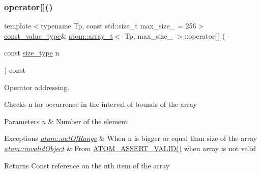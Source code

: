 \subsubsection{\texorpdfstring{operator[]()}{operator[]()}\hspace{0.1cm}{\footnotesize\ttfamily [1/2]}}
{\footnotesize\ttfamily template$<$typename Tp, const std\+::size\+\_\+t max\+\_\+size\+\_\+ = 256$>$ \\
\hyperlink{classatom_1_1array__t_a9c33ee3fb4e5b4d57c7801a8f69ada14}{const\+\_\+value\+\_\+type}\& \hyperlink{classatom_1_1array__t}{atom\+::array\+\_\+t}$<$ Tp, max\+\_\+size\+\_\+ $>$\+::operator\mbox{[}$\,$\mbox{]} (\begin{DoxyParamCaption}\item[{const \hyperlink{classatom_1_1array__t_a8534f23c7f0082698cbd708e1f2e26ff}{size\+\_\+type}}]{n }\end{DoxyParamCaption}) const\hspace{0.3cm}{\ttfamily [inline]}}



Operator addressing. 

Checks n for occurrence in the interval of bounds of the array 
\begin{DoxyParams}{Parameters}
{\em n} & Number of the element \\
\hline
\end{DoxyParams}

\begin{DoxyExceptions}{Exceptions}
{\em \hyperlink{classatom_1_1out_of_range}{atom\+::out\+Of\+Range}} & When n is bigger or equal than size of the array \\
\hline
{\em \hyperlink{classatom_1_1invalid_object}{atom\+::invalid\+Object}} & From \hyperlink{debug__tools_8h_a273b49426c51bc6a7eb989ee0acbdc6b}{A\+T\+O\+M\+\_\+\+A\+S\+S\+E\+R\+T\+\_\+\+V\+A\+L\+I\+D()} when array is not valid \\
\hline
\end{DoxyExceptions}
\begin{DoxyReturn}{Returns}
Const reference on the nth item of the array 
\end{DoxyReturn}
\mbox{\label{classatom_1_1array__t_ad96738ee0018dce88aaeb9941c24dee0}} 
